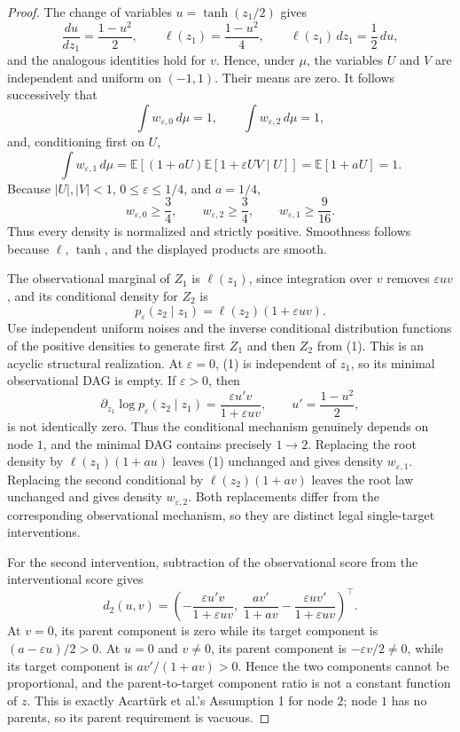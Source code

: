 \documentclass{article}
\begin{document}
\begin{proof}
The change of variables \(u=\tanh(z_1/2)\) gives
\[
 \frac{du}{dz_1}=\frac{1-u^2}{2},
 \qquad
 \ell(z_1)=\frac{1-u^2}{4},
 \qquad
 \ell(z_1)\,dz_1=\frac12\,du,
\]
and the analogous identities hold for \(v\).  Hence, under \(\mu\), the variables \(U\) and \(V\) are independent and uniform on \((-1,1)\).  Their means are zero.  It follows successively that
\[
 \int w_{\varepsilon,0}\,d\mu=1,
 \qquad
 \int w_{\varepsilon,2}\,d\mu=1,
\]
and, conditioning first on \(U\),
\[
 \int w_{\varepsilon,1}\,d\mu
 =\mathbb E\!\left[(1+aU)\mathbb E[1+\varepsilon UV\mid U]\right]
 =\mathbb E[1+aU]=1.
\]
Because \(|U|,|V|<1\), \(0\le\varepsilon\le1/4\), and \(a=1/4\),
\[
 w_{\varepsilon,0}\ge\frac34,
 \qquad
 w_{\varepsilon,2}\ge\frac34,
 \qquad
 w_{\varepsilon,1}\ge\frac9{16}.
\]
Thus every density is normalized and strictly positive.  Smoothness follows because \(\ell\), \(\tanh\), and the displayed products are smooth.

The observational marginal of \(Z_1\) is \(\ell(z_1)\), since integration over \(v\) removes \(\varepsilon uv\), and its conditional density for \(Z_2\) is
\[
 p_{\varepsilon}(z_2\mid z_1)=\ell(z_2)(1+\varepsilon uv).
 \tag{1}
\]
Use independent uniform noises and the inverse conditional distribution functions of the positive densities to generate first \(Z_1\) and then \(Z_2\) from (1).  This is an acyclic structural realization.  At \(\varepsilon=0\), (1) is independent of \(z_1\), so its minimal observational DAG is empty.  If \(\varepsilon>0\), then
\[
 \partial_{z_1}\log p_{\varepsilon}(z_2\mid z_1)
 =\frac{\varepsilon u'v}{1+\varepsilon uv},
 \qquad u'=\frac{1-u^2}{2},
\]
is not identically zero.  Thus the conditional mechanism genuinely depends on node \(1\), and the minimal DAG contains precisely \(1\to2\).  Replacing the root density by \(\ell(z_1)(1+au)\) leaves (1) unchanged and gives density \(w_{\varepsilon,1}\).  Replacing the second conditional by \(\ell(z_2)(1+av)\) leaves the root law unchanged and gives density \(w_{\varepsilon,2}\).  Both replacements differ from the corresponding observational mechanism, so they are distinct legal single-target interventions.

For the second intervention, subtraction of the observational score from the interventional score gives
\[
 d_2(u,v)=\left(-\frac{\varepsilon u'v}{1+\varepsilon uv},\;\frac{av'}{1+av}-\frac{\varepsilon uv'}{1+\varepsilon uv}\right)^\top.
\]
At \(v=0\), its parent component is zero while its target component is \((a-\varepsilon u)/2>0\). At \(u=0\) and \(v\ne0\), its parent component is \(-\varepsilon v/2\ne0\), while its target component is \(av'/(1+av)>0\). Hence the two components cannot be proportional, and the parent-to-target component ratio is not a constant function of \(z\). This is exactly Acartürk et al.'s Assumption 1 for node \(2\); node \(1\) has no parents, so its parent requirement is vacuous.


\end{proof}
\end{document}
